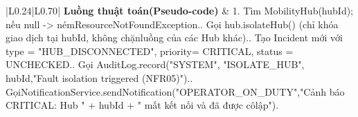 \begin{longtable}{|L{0.24\textwidth}|L{0.70\textwidth}|}
\textbf{Luồng thuật toán}\newline \textbf{(Pseudo-code)} & 1. Tìm MobilityHub(hubId); nếu null -> ném\newline ResourceNotFoundException.. Gọi hub.isolateHub() (chỉ khóa giao dịch tại hubId, không chặn\newline luồng của các Hub khác).. Tạo Incident mới với type = "HUB\_DISCONNECTED", priority\newline = CRITICAL, status = UNCHECKED.. Gọi AuditLog.record("SYSTEM", "ISOLATE\_HUB", hubId,\newline "Fault isolation triggered (NFR05)").. Gọi\newline NotificationService.sendNotification("OPERATOR\_ON\_DUTY",\newline "Cảnh báo CRITICAL: Hub " + hubId + " mất kết nối và đã được cô\newline lập"). \\
\hline
\end{longtable}
\vspace{-0.5\baselineskip}

